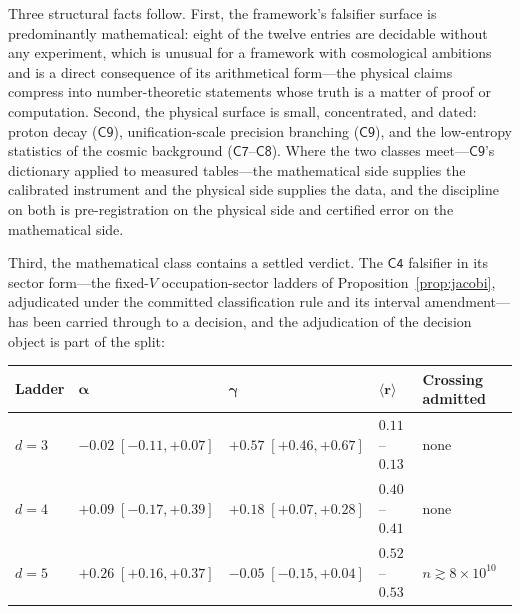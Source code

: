 Three structural facts follow. First, the framework's falsifier surface is predominantly
mathematical: eight of the twelve entries are decidable without any experiment, which is
unusual for a framework with cosmological ambitions and is a direct consequence of its
arithmetical form---the physical claims compress into number-theoretic statements whose
truth is a matter of proof or computation. Second, the physical surface is small,
concentrated, and dated: proton decay ($\mathsf{C9}$), unification-scale precision
branching ($\mathsf{C9}$), and the low-entropy statistics of the cosmic background
($\mathsf{C7}$--$\mathsf{C8}$). Where the two classes meet---$\mathsf{C9}$'s dictionary
applied to measured tables---the mathematical side supplies the calibrated instrument and
the physical side supplies the data, and the discipline on both is pre-registration on the
physical side and certified error on the mathematical side.

Third, the mathematical class contains a settled verdict. The $\mathsf{C4}$ falsifier in
its sector form---the fixed-$V$ occupation-sector ladders of
Proposition~\ref{prop:jacobi}, adjudicated under the committed classification rule and
its interval amendment---has been carried through to a decision, and the adjudication
of the decision object is part of the split:

\begin{center}
\small
\begin{tabular}{@{}lllll@{}}
\toprule
\textbf{Ladder} & $\boldsymbol{\alpha}$ & $\boldsymbol{\gamma}$ &
$\boldsymbol{\langle r\rangle}$ & \textbf{Crossing admitted}\\
\midrule
$d=3$ & $-0.02\;[-0.11,+0.07]$ & $+0.57\;[+0.46,+0.67]$ & $0.11$--$0.13$ & none\\
$d=4$ & $+0.09\;[-0.17,+0.39]$ & $+0.18\;[+0.07,+0.28]$ & $0.40$--$0.41$ & none\\
$d=5$ & $+0.26\;[+0.16,+0.37]$ & $-0.05\;[-0.15,+0.04]$ & $0.52$--$0.53$ & $n\gtrsim8\times10^{10}$\\
\bottomrule
\end{tabular}
\end{center}

